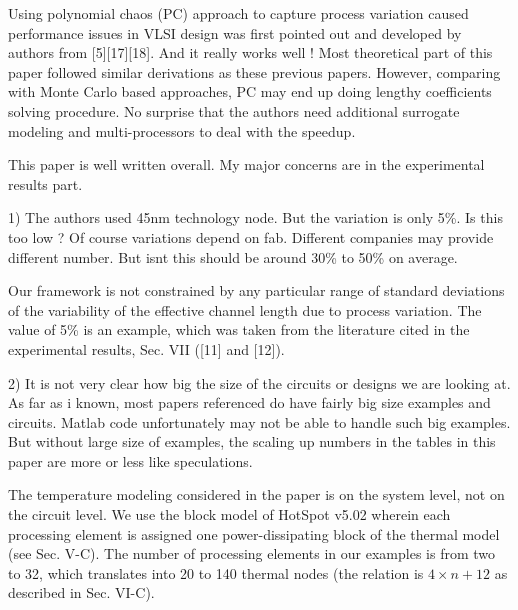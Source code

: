 \begin{reviewer}
Using polynomial chaos (PC) approach to capture process variation caused performance issues in VLSI design was first pointed out and developed by authors from [5][17][18]. And it really works well ! Most theoretical part of this paper followed similar derivations as these previous papers. However, comparing with Monte Carlo based approaches, PC may end up doing  lengthy  coefficients solving procedure. No surprise that the authors need additional surrogate modeling and multi-processors to deal with the speedup.

This paper is well written overall. My major concerns are in the experimental results part.

1) The authors used 45nm technology node. But the variation is only 5\%. Is this too low ? Of course variations depend on fab. Different companies may provide different number. But isnt this should be around 30\% to 50\% on average.
\end{reviewer}
\begin{authors}
Our framework is not constrained by any particular range of standard deviations of the variability of the effective channel length due to process variation.
The value of 5\% is an example, which was taken from the literature cited in the experimental results, Sec. VII ([11] and [12]).
\end{authors}

\begin{reviewer}
2) It is not very clear how big the size of the circuits or designs we are looking at.
As far as i known, most papers referenced do have fairly big size examples and circuits. Matlab code unfortunately may not be able to handle such big examples.
But without large size of examples, the scaling up numbers in the tables in this paper are more or less like speculations.
\end{reviewer}
\begin{authors}
The temperature modeling considered in the paper is on the system level, not on the circuit level.
We use the block model of HotSpot v5.02 wherein each processing element is assigned one power-dissipating block of the thermal model (see Sec. V-C).
The number of processing elements in our examples is from two to 32, which translates into 20 to 140 thermal nodes (the relation is $4 \times n + 12$ as described in Sec. VI-C).
\end{authors}


